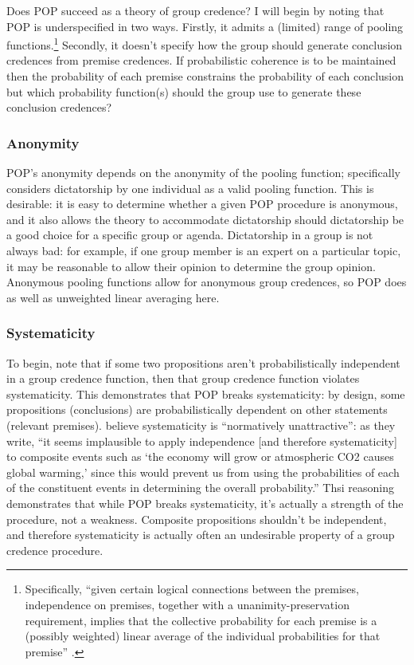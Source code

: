 \documentclass{article}
\begin{document}
Does POP succeed as a theory of group credence? I will begin by noting that POP is underspecified in two ways. Firstly, it admits a (limited) range of pooling functions.\footnote{Specifically, ``given certain logical connections between the premises, independence on premises, together with a unanimity-preservation requirement, implies that the collective probability for each premise is a (possibly weighted) linear average of the individual probabilities for that premise'' \citep{dietrich2013probabilistic}.} Secondly, it doesn't specify how the group should generate conclusion credences from premise credences. If probabilistic coherence is to be maintained then the probability of each premise constrains the probability of each conclusion \textemdash{} but which probability function(s) should the group use to generate these conclusion credences?

\subsubsection{Anonymity}

POP's anonymity depends on the anonymity of the pooling function; \citet[pg. 21]{dietrich2013probabilistic} specifically considers dictatorship by one individual as a valid pooling function. This is desirable: it is easy to determine whether a given POP procedure is anonymous, and it also allows the theory to accommodate dictatorship should dictatorship be a good choice for a specific group or agenda. Dictatorship in a group is not always bad: for example, if one group member is an expert on a particular topic, it may be reasonable to allow their opinion to determine the group opinion. Anonymous pooling functions allow for anonymous group credences, so POP does as well as unweighted linear averaging here.

\subsubsection{Systematicity}

To begin, note that if some two propositions aren't probabilistically independent in a group credence function, then that group credence function violates systematicity. This demonstrates that POP breaks systematicity: by design, some propositions (conclusions) are probabilistically dependent on other statements (relevant premises). \citet[pg. 6]{dietrich2013probabilistic} believe systematicity is ``normatively unattractive'': as they write, ``it seems implausible to apply independence [and therefore systematicity] to composite events such as `the economy will grow or atmospheric CO2 causes global warming,' since this would prevent us from using the probabilities of each of the constituent events in determining the overall probability.'' Thsi reasoning demonstrates that while POP breaks systematicity, it's actually a strength of the procedure, not a weakness. Composite propositions shouldn't be independent, and therefore systematicity is actually often an undesirable property of a group credence procedure.
\end{document}
